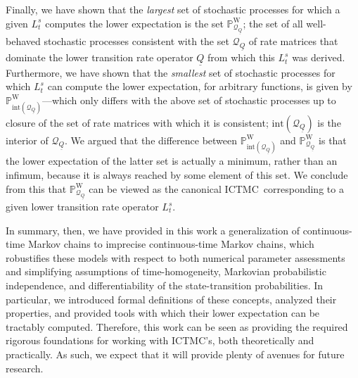 \documentclass[10pt,a4paper]{paper}
\theoremstyle{definition}
\newcommand{\processes}{\mathbb{P}}
\newcommand{\wprocesses}{\processes^{\mathrm{W}}}
\newcommand{\rateset}{\mathcal{Q}}
\newcommand{\lrate}{\underline{Q}}
\newcommand{\ictmc}{{ICTMC}}
\begin{document}
Finally, we have shown that the \emph{largest} set of stochastic processes for which a given $L_t^s$ computes the lower expectation is the set $\wprocesses_{\rateset_{\lrate}}$; the set of all well-behaved stochastic processes consistent with the set $\rateset_{\lrate}$ of rate matrices that dominate the lower transition rate operator $\lrate$ from which this $L_t^s$ was derived. Furthermore, we have shown that the \emph{smallest} set of stochastic processes for which $L_t^s$ can compute the lower expectation, for arbitrary functions, is given by $\wprocesses_{\text{int}(\rateset_{\lrate})}$---which only differs with the above set of stochastic processes up to closure of the set of rate matrices with which it is consistent; $\text{int}(\rateset_{\lrate})$ is the interior of $\rateset_{\lrate}$. We argued that the difference between $\wprocesses_{\text{int}(\rateset_{\lrate})}$ and $\wprocesses_{\rateset_{\lrate}}$ is that the lower expectation of the latter set is actually a minimum, rather than an infimum, because it is always reached by some element of this set. We conclude from this that $\wprocesses_{\rateset_{\lrate}}$ can be viewed as the canonical \ictmc~corresponding to a given lower transition rate operator $L_t^s$.

In summary, then, we have provided in this work a generalization of continuous-time Markov chains to imprecise continuous-time Markov chains, which robustifies these models with respect to both numerical parameter assessments and simplifying assumptions of time-homogeneity, Markovian probabilistic independence, and differentiability of the state-transition probabilities. In particular, we introduced formal definitions of these concepts, analyzed their properties, and provided tools with which their lower expectation can be tractably computed. Therefore, this work can be seen as providing the required rigorous foundations for working with \ictmc's, both theoretically and practically. As such, we expect that it will provide plenty of avenues for future research. 

\end{document}
